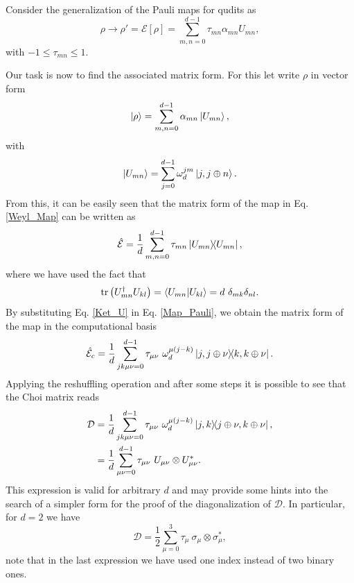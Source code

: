 Consider the generalization of the Pauli maps for qudits as
% 
\begin{equation}
\rho \to \rho'=\mathcal{E}[\rho ]=\sum_{m,n=0}^{d-1} \tau_{mn} \alpha_{mn} U_{mn},
\label{Weyl_Map}
\end{equation}
% 
with $-1\leq \tau_{mn} \leq 1$. 

Our task is now to find the associated matrix form. For this let write $\rho$ in vector form
% 
\begin{equation}
\ket{\rho} = \sum_{m,n=0}^{d-1} \alpha_{mn} \ket{U_{mn}},
\end{equation}
% 
with
% 
\begin{equation}
\ket{U_{mn}}=\sum_{j=0}^{d-1}\omega_d^{j m}\ket{j,j\oplus n}.
\label{Ket_U}
\end{equation}
% 
From this, it can be easily seen that the matrix form of the map in Eq. \ref{Weyl_Map} can be written as
% 
\begin{equation}
\hat{\mathcal{E}} = \frac{1}{d}\sum_{m,n=0}^{d-1} \tau_{mn} \dyad{U_{mn}},
\label{Map_Pauli}
\end{equation}
% 
where we have used the fact that
% 
\begin{equation}
 \tr \left(U_{mn}^{\dagger} U_{kl}\right) = \braket{{U_{mn}} }{{U_{kl} }} = d ~\delta_{mk}\delta_{nl}.
\end{equation}
% 
By substituting Eq. \ref{Ket_U} in Eq. \ref{Map_Pauli}, we obtain the matrix form of the map in the computational basis
% 
\begin{equation}
 \hat{\mathcal{E}}_c = \frac{1}{d}\sum_{jk\mu\nu=0}^{d-1} \tau_{\mu\nu}~ \omega_d^{\mu (j-k)} \dyad{j,j\oplus \nu}{k,k\oplus \nu}.
\end{equation}
% 
Applying the reshuffling operation and after some steps it is possible to see that the Choi matrix reads
% 
\begin{align}
 \mathcal{D} &=  \frac{1}{d}\sum_{jk\mu\nu=0}^{d-1} \tau_{\mu\nu}~ \omega_d^{\mu (j-k)} \dyad{j,k}{j\oplus \nu,k\oplus \nu},\\
 & = \frac{1}{d}\sum_{\mu\nu=0}^{d-1} \tau_{\mu\nu} ~U_{\mu\nu}\otimes U_{\mu\nu}^*.
 \label{Choi_1}
\end{align}
% 
This expression is valid for arbitrary $d$ and may provide some hints into the search of a simpler form for the proof of the diagonalization of $\mathcal{D}$. In particular, for $d=2$ we have
%  
\begin{equation}
  \mathcal{D} = \frac{1}{2}\sum_{\mu=0}^{3} \tau_{\mu} ~\sigma_{\mu}\otimes \sigma_{\mu}^*,
\end{equation}
% 
note that in the last expression we have used one index instead of two binary ones.
